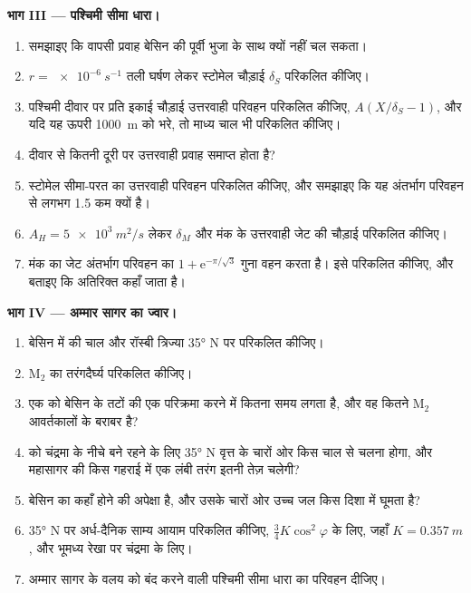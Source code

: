 \begin{problem}
\medskip\noindent\textbf{भाग III --- पश्चिमी सीमा धारा।}
\begin{enumerate}[resume]
\item समझाइए कि वापसी प्रवाह बेसिन की पूर्वी
  भुजा के साथ क्यों नहीं चल सकता।
\item $r = \qty{e-6}{s^{-1}}$ तली घर्षण लेकर स्टोमेल
  चौड़ाई $\delta_S$ परिकलित कीजिए।
\item पश्चिमी दीवार पर प्रति इकाई चौड़ाई उत्तरवाही परिवहन परिकलित कीजिए,
  $A(X/\delta_S - 1)$, और यदि यह ऊपरी
  \qty{1000}{m} को भरे, तो माध्य चाल भी परिकलित कीजिए।
\item दीवार से कितनी दूरी पर उत्तरवाही प्रवाह समाप्त होता है?
\item स्टोमेल सीमा-परत का उत्तरवाही परिवहन परिकलित कीजिए, और
  समझाइए कि यह अंतर्भाग परिवहन से लगभग
  \qty{1.5}{\sverdrup} कम क्यों है।
\item $A_H = \qty{5e3}{m^2/s}$ लेकर $\delta_M$ और
  मंक के उत्तरवाही जेट की चौड़ाई परिकलित कीजिए।
\item मंक का जेट अंतर्भाग परिवहन का $1 + \mathrm e^{-\pi/\sqrt3}$ गुना
  वहन करता है। इसे परिकलित कीजिए, और बताइए कि अतिरिक्त कहाँ जाता है।
\end{enumerate}

\medskip\noindent\textbf{भाग IV --- अम्मार सागर का ज्वार।}
\begin{enumerate}[resume]
\item बेसिन में  की चाल और रॉस्बी त्रिज्या
  \ang{35} N पर परिकलित कीजिए।
\item M$_2$  का तरंगदैर्घ्य परिकलित कीजिए।
\item एक  को बेसिन के तटों की एक परिक्रमा करने में कितना समय लगता है,
  और वह कितने M$_2$ आवर्तकालों के बराबर है?
\item {} को चंद्रमा के नीचे बने रहने के लिए \ang{35} N वृत्त के चारों ओर किस चाल से चलना होगा,
  और महासागर की किस गहराई में
  एक लंबी तरंग इतनी तेज़ चलेगी?
\item बेसिन का  कहाँ होने की अपेक्षा है, और
  उसके चारों ओर उच्च जल किस दिशा में घूमता है?
\item \ang{35} N पर अर्ध-दैनिक साम्य आयाम परिकलित कीजिए, $\tfrac34
  K\cos^2\varphi$ के लिए, जहाँ $K = \qty{0.357}{m}$, और भूमध्य रेखा पर चंद्रमा के लिए।
\item अम्मार सागर के वलय को बंद करने वाली पश्चिमी सीमा धारा
  का परिवहन दीजिए।
\end{enumerate}
\end{problem}
